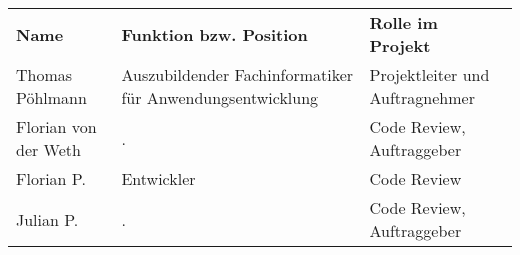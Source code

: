 \begin{tabularx}{\textwidth}{lXl}
\rowcolor{heading}\textbf{Name} & \textbf{Funktion bzw. Position} & \textbf{Rolle im Projekt} \\
Thomas Pöhlmann & Auszubildender Fachinformatiker für Anwendungsentwicklung & Projektleiter und Auftragnehmer \\
\rowcolor{odd}Florian von der Weth & . & Code Review, Auftraggeber \\
Florian P. & Entwickler & Code Review \\
\rowcolor{odd}Julian P. & . & Code Review, Auftraggeber \\
\end{tabularx}